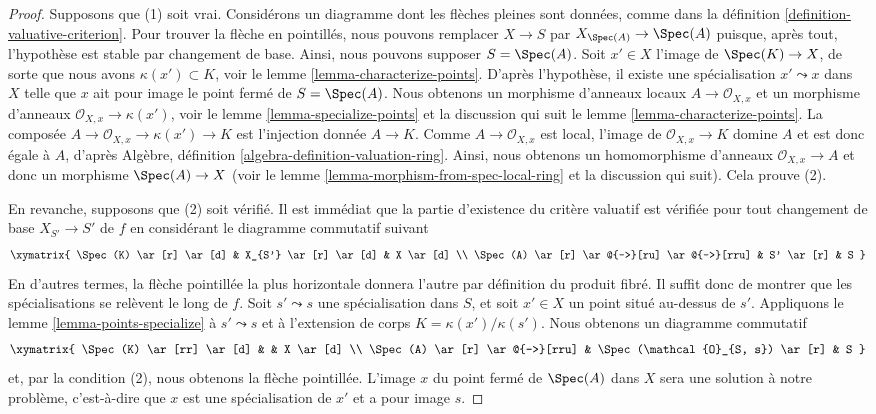 \begin{proof}
Supposons que (1) soit vrai. Considérons un diagramme
dont les flèches pleines sont données, comme dans la définition
\ref{definition-valuative-criterion}. Pour trouver la flèche en
pointillés, nous pouvons remplacer $X \to S$ par
$X_{\Spec(A)} \to \Spec(A)$ puisque, après tout,
l’hypothèse est stable par changement de base.
Ainsi, nous pouvons supposer $S = \Spec(A)$. Soit $x' \in
X$ l’image de $\Spec(K) \to X$, de sorte que
nous avons $\kappa(x') \subset K$, voir le
lemme \ref{lemma-characterize-points}. D’après l’hypothèse, il existe
une spécialisation $x' \leadsto x$ dans $X$ telle que $x$ ait pour image
le point fermé de $S = \Spec(A)$. Nous obtenons un morphisme d’anneaux
locaux $A \to \mathcal{O}_{X, x}$ et un morphisme
d’anneaux $\mathcal{O}_{X, x} \to \kappa(x')$, voir le lemme
\ref{lemma-specialize-points} et la discussion qui suit le lemme
\ref{lemma-characterize-points}. La composée $A \to \mathcal{O}_{X, x}
\to \kappa(x') \to K$ est l'injection donnée $A \to K$. Comme $A \to
\mathcal{O}_{X, x}$ est local, l'image de $\mathcal{O}_{X,
x} \to K$ domine $A$ et est donc égale à $A$,
d'après Algèbre, définition \ref{algebra-definition-valuation-ring}.
Ainsi, nous obtenons un homomorphisme d'anneaux $\mathcal{O}_{X,
x} \to A$ et donc un morphisme $\Spec(A)
\to X$ (voir le lemme \ref{lemma-morphism-from-spec-local-ring}
et la discussion qui suit). Cela prouve (2).

\medskip\noindent
En revanche, supposons que (2) soit vérifié. Il est immédiat
que la partie d'existence du critère valuatif est vérifiée
pour tout changement de base $X_{S'} \to S'$ de $f$ en considérant
le diagramme commutatif suivant
$$
\xymatrix{
\Spec(K) \ar[r] \ar[d] & X_{S'} \ar[r] \ar[d] & X \ar[d] \\
\Spec(A) \ar[r] \ar@{-->}[ru] \ar@{-->}[rru] & S' \ar[r] & S
}
$$
En d'autres termes, la flèche pointillée la plus horizontale donnera
l'autre par définition du produit fibré. Il suffit donc de montrer
que les spécialisations se relèvent le long de $f$. Soit
$s' \leadsto s$ une spécialisation dans $S$, et soit $x' \in
X$ un point situé au-dessus de $s'$. Appliquons
le lemme \ref{lemma-points-specialize}
à $s' \leadsto s$ et à l'extension de corps $K =
\kappa(x')/\kappa(s')$. Nous
obtenons un diagramme commutatif
$$
\xymatrix{
\Spec(K) \ar[rr] \ar[d] & & X \ar[d] \\
\Spec(A) \ar[r] \ar@{-->}[rru] &
\Spec(\mathcal{O}_{S, s}) \ar[r] & S
}
$$
et, par la condition (2), nous obtenons la flèche
pointillée. L'image $x$ du point fermé de $\Spec(A)$ dans
$X$ sera une solution à notre problème, c'est-à-dire que
$x$ est une spécialisation de $x'$ et a pour image $s$.
\end{proof}

